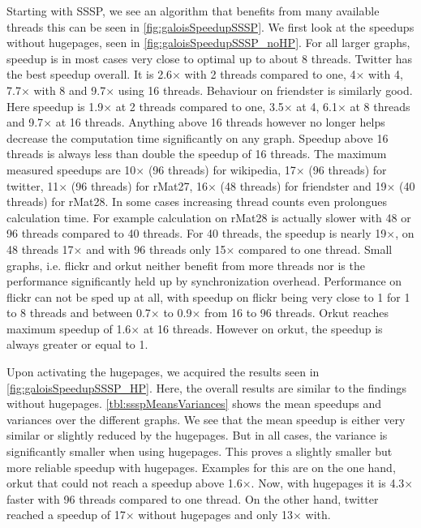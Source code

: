 Starting with SSSP, we see an algorithm that benefits from many available threads this can be seen in \autoref{fig:galoisSpeedupSSSP}.
We first look at the speedups without hugepages, seen in \autoref{fig:galoisSpeedupSSSP_noHP}.
For all larger graphs, speedup is in most cases very close to optimal up to about 8 threads.
Twitter has the best speedup overall. It is 2.6$\times$ with 2 threads compared to one, 4$\times$ with 4, 7.7$\times$ with 8 and 9.7$\times$ using 16 threads.
Behaviour on friendster is similarly good. Here speedup is 1.9$\times$ at 2 threads compared to one, 3.5$\times$ at 4, 6.1$\times$ at 8 threads and 9.7$\times$ at 16 threads.
Anything above 16 threads however no longer helps decrease the computation time significantly on any graph. Speedup above 16 threads is always less than double the speedup of 16 threads. The maximum measured speedups are 10$\times$ (96 threads) for wikipedia, 17$\times$ (96 threads) for twitter, 11$\times$ (96 threads) for rMat27, 16$\times$ (48 threads) for friendster and 19$\times$ (40 threads) for rMat28.
In some cases increasing thread counts even prolongues calculation time. For example calculation on rMat28 is actually slower with 48 or 96 threads compared to 40 threads. For 40 threads, the speedup is nearly 19$\times$, on 48 threads 17$\times$ and with 96 threads only 15$\times$ compared to one thread.
Small graphs, i.e. flickr and orkut neither benefit from more threads nor is the performance significantly held up by synchronization overhead.
Performance on flickr can not be sped up at all, with speedup on flickr being very close to 1 for 1 to 8 threads and between 0.7$\times$ to 0.9$\times$ from 16 to 96 threads.
Orkut reaches maximum speedup of 1.6$\times$ at 16 threads. However on orkut, the speedup is always greater or equal to 1.

Upon activating the hugepages, we acquired the results seen in \autoref{fig:galoisSpeedupSSSP_HP}. Here, the overall results are similar to the findings without hugepages. \autoref{tbl:ssspMeansVariances} shows the mean speedups and variances over the different graphs. We see that the mean speedup is either very similar or slightly reduced by the hugepages. But in all cases, the variance is significantly smaller when using hugepages. This proves a slightly smaller but more reliable speedup with hugepages.
Examples for this are on the one hand, orkut that could not reach a speedup above 1.6$\times$. Now, with hugepages it is 4.3$\times$ faster with 96 threads compared to one thread. On the other hand, twitter reached a speedup of 17$\times$ without hugepages and only 13$\times$ with.

